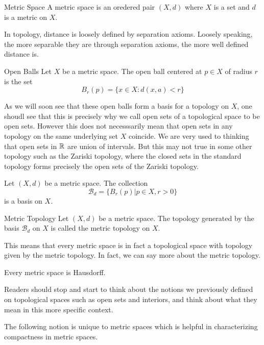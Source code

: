 \documentclass[a4paper]{article}
\begin{document}
\begin{defn}{Metric Space}{} A metric space is an oredered pair $(X,d)$ where $X$ is a set and $d$ is a metric on $X$. 
\end{defn}

In topology, distance is loosely defined by separation axioms. Loosely speaking, the more separable they are through separation axioms, the more well defined distance is. 

\begin{defn}{Open Balls}{} Let $X$ be a metric space. The open ball centered at $p\in X$ of radius $r$ is the set $$B_r(p)=\{x\in X:d(x,a)<r\}$$
\end{defn}

As we will soon see that these open balls form a basis for a topology on $X$, one shoudl see that this is precisely why we call open sets of a topological space to be open sets. However this does not necesssarily mean that open sets in any topology on the same underlying set $X$ coincide. We are very used to thinking that open sets in $\mathbb{R}$ are union of intervals. But this may not true in some other topology such as the Zariski topology, where the closed sets in the standard topology forms precisely the open sets of the Zariski topology. 

\begin{prp}{}{} Let $(X,d)$ be a metric space. The collection $$\mathcal{B}_d=\{B_r(p)|p\in X,r>0\}$$ is a basis on $X$. 
\end{prp}

\begin{defn}{Metric Topology}{} Let $(X,d)$ be a metric space. The topology generated by the basis $\mathcal{B}_d$ on $X$ is called the metric topology on $X$. 
\end{defn}

This means that every metric space is in fact a topological space with topology given by the metric topology. In fact, we can say more about the metric topology. 

\begin{prp}{}{} Every metric space is Hausdorff. 
\end{prp}

Readers should stop and start to think about the notions we previously defined on topological spaces such as open sets and interiors, and think about what they mean in this more specific context. 

The following notion is unique to metric spaces which is helpful in characterizing compactness in metric spaces. 
\end{document}
